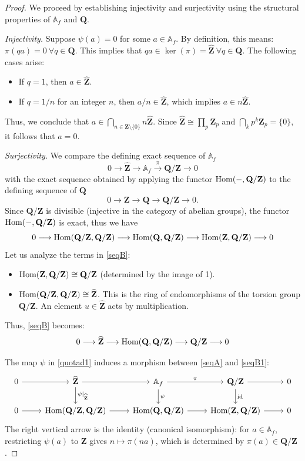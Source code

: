 \documentclass[11pt,a4paper]{article}
\newcommand{\Q}{\mathbf{Q}}
\newcommand{\Z}{\mathbf{Z}}
\newcommand{\A}{\mathbb{A}}
\newcommand{\Zhat}{\widehat{\Z}}
\def\Hom{\rm{Hom}}
\theoremstyle{plain}
\theoremstyle{definition} %
\begin{document}
\begin{proof}
We proceed by establishing injectivity and surjectivity using the structural properties of $\A_f$ and $\Q$.

\emph{Injectivity.} 
Suppose $\psi(a) = 0$ for some $a \in \A_f$. By definition, this means:
$
\pi(qa) = 0~ \forall q \in \Q
$. 
This implies that $qa \in \ker(\pi) = \Zhat~ \forall q \in \Q$. The following cases arise:
\begin{itemize}[leftmargin=*, labelindent=0pt]
    \item[] If $q=1$, then  $a \in \Zhat$.
    \item[] If $q=1/n$ for an integer $n$, then $a/n \in \Zhat$, which implies $a \in n\Zhat$.
\end{itemize}
Thus, we conclude that $a \in \bigcap_{n \in \Z \setminus \{0\}} n\Zhat$.
Since $\Zhat \cong \prod_p \Z_p$ and $\bigcap_k p^k \Z_p = \{0\}$, it follows that $a = 0$.

\emph{Surjectivity.} 
We compare the defining exact sequence of $\A_f$ 
\begin{equation}\label{seqA}
0 \longrightarrow \Zhat \longrightarrow \A_f \xrightarrow{\pi} \Q/\Z \longrightarrow 0
\end{equation}
with the exact sequence obtained by applying the functor $\Hom(-, \Q/\Z)$ to the defining sequence of $\Q$ 
\[0 \to \Z \to \Q \to \Q/\Z \to 0.
\]
Since $\Q/\Z$ is divisible (injective in the category of abelian groups), the functor $\Hom(-, \Q/\Z)$ is exact, thus we have
\begin{equation}\label{seqB}
0 \longrightarrow \Hom(\Q/\Z, \Q/\Z) \longrightarrow \Hom(\Q, \Q/\Z) \longrightarrow \Hom(\Z, \Q/\Z) \longrightarrow 0
\end{equation}
Let us analyze the terms in \eqref{seqB}:
\begin{itemize}[leftmargin=*, labelindent=0pt]
    \item[] $\Hom(\Z, \Q/\Z) \cong \Q/\Z$ (determined by the image of 1).
    \item[] $\Hom(\Q/\Z, \Q/\Z) \cong \Zhat$. This is the ring of endomorphisms of the torsion group $\Q/\Z$. An element $u \in \Zhat$ acts by multiplication.
\end{itemize}
Thus, \eqref{seqB} becomes:
\begin{equation}\label{seqB1}
0 \longrightarrow \Zhat \longrightarrow \Hom(\Q, \Q/\Z) \longrightarrow \Q/\Z \longrightarrow 0
\end{equation}


The map $\psi$ in \eqref{quotad1} induces a morphism between \eqref{seqA} and \eqref{seqB1}:
\[
\begin{tikzcd}
0 \arrow[r] & \Zhat \arrow[r] \arrow[d, "\psi|_{\Zhat}"] & \A_f \arrow[r, "\pi"] \arrow[d, "\psi"] & \Q/\Z \arrow[r] \arrow[d, "\text{id}"] & 0 \\
0 \arrow[r] & \Hom(\Q/\Z, \Q/\Z) \arrow[r] & \Hom(\Q, \Q/\Z) \arrow[r] & \Hom(\Z, \Q/\Z) \arrow[r] & 0
\end{tikzcd}
\]
The right vertical arrow is the identity (canonical isomorphism): for $a \in \A_f$, restricting $\psi(a)$ to $\Z$ gives $n \mapsto \pi(na)$, which is determined by $\pi(a) \in \Q/\Z$.
 

\end{proof}
\end{document}
